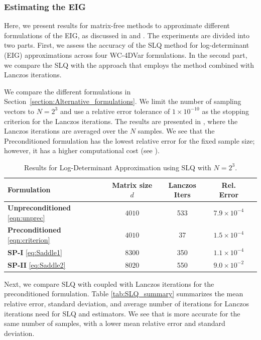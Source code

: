 \documentclass{aims} %
\theoremstyle{definition}
\begin{document}
\subsubsection*{Estimating the EIG}

Here, we present results for matrix-free methods to approximate different formulations of the EIG, as discussed in  and . The experiments are divided into two parts.
%
First, we assess the accuracy of the SLQ method for log-determinant (EIG) approximations across four WC-4DVar formulations. In the second part, we compare the SLQ with the approach that employs the \xntrace{} method combined with Lanczos iterations. 


We compare the different formulations in Section~\ref{section:Alternative_formulations}. We limit the number of sampling vectors  to $N=2^3$ and use a relative error tolerance of $1 \times 10^{-10}$ as the stopping criterion for the Lanczos iterations. The results are presented in , where the Lanczos iterations are averaged over the $N$ samples. We see that the Preconditioned formulation has the lowest relative error for the fixed sample size; however, it has a higher computational cost (see ).  

\begin{table}[!ht]
\centering
\begin{tabular}{lcccc}
\toprule
\textbf{Formulation} & \textbf{Matrix size} $d$ & \textbf{Lanczos Iters} &  \textbf{Rel. Error} \\
\midrule
\textbf{Unpreconditioned} \eqref{eqn:unprec}  & $4010$ & 533 &  $7.9 \times 10^{-4}$ \\
\textbf{Preconditioned} \eqref{eqn:criterion} & $4010$ & 37 &   $1.5 \times 10^{-4}$\\
\textbf{SP-I} \eqref{eq:Saddle1} & $8300$ & 350 &   $1.1 \times 10^{-4}$\\
\textbf{SP-II} \eqref{eq:Saddle2} & $8020$ & 550 &$9.0 \times 10^{-2}$ \\
\bottomrule
\end{tabular}
\caption{Results for Log-Determinant Approximation using SLQ with $N=2^3.$ }
\label{tab:logdet_4form}
\end{table}




%
Next, we compare SLQ with \xntrace{} coupled with Lanczos iterations for the preconditioned formulation.  
Table \ref{tab:SLQ_summary} summarizes the mean relative error, standard deviation, and average number of iterations for Lanczos iterations need for SLQ and \xntrace{} estimators. We see that \xntrace{} is more accurate for the same number of samples, with a lower mean relative error and standard deviation. 
\end{document}
